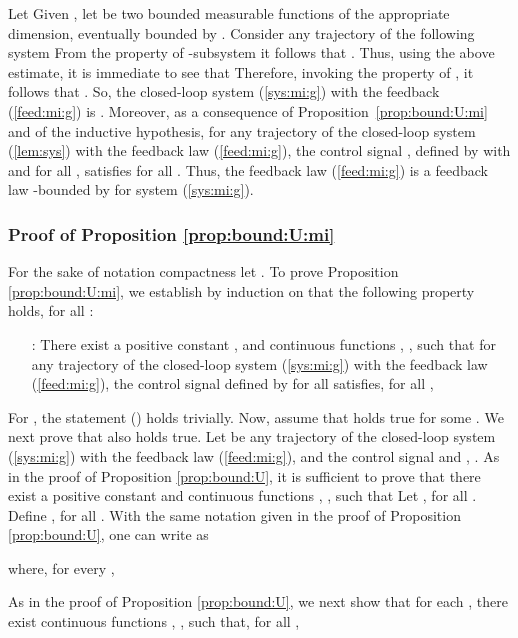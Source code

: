 \documentclass[letterpaper, 10pt]{article}
\newcommand{\rref}[1]{(\ref{#1})}
\begin{document}
Let 
Given , let  be two bounded measurable functions of the appropriate dimension, eventually bounded by . Consider any trajectory  of the following system
 From the  property of -subsystem it follows that . Thus, using the above estimate, it is immediate to see that  Therefore, invoking the  property of
, it follows that . So, the closed-loop system \rref{sys:mi:g} with the feedback \rref{feed:mi:g} is .
Moreover, as a consequence of Proposition~\ref{prop:bound:U:mi} and of the inductive hypothesis, for any trajectory of the closed-loop system \rref{lem:sys} with the feedback law \rref{feed:mi:g}, the control signal , defined by  with  and  for all , satisfies  for all . Thus, the feedback law \rref{feed:mi:g} is a  feedback law -bounded by  for system \rref{sys:mi:g}.

\subsubsection{Proof of Proposition \ref{prop:bound:U:mi}}
\label{sss:Pr:3}
For the sake of notation compactness let . To prove Proposition \ref{prop:bound:U:mi}, we establish by induction on  that the following property holds, for all :
\begin{itemize}
\item[ :]There exist a positive constant , and continuous functions , , such that for any trajectory of the closed-loop system \rref{sys:mi:g} with the feedback law \rref{feed:mi:g}, the control signal  defined by  for all  satisfies, for all ,

\end{itemize}

For , the statement () holds trivially. Now, assume that  holds true for some . We next prove that  also holds true. Let  be any trajectory of the closed-loop system \rref{sys:mi:g} with the feedback law \rref{feed:mi:g}, and the control signal  and , . As in the proof of Proposition \ref{prop:bound:U}, it is sufficient to prove that there exist a positive constant  and continuous functions , , such that
Let , for all . Define , for all . With the same notation given in the proof of Proposition \ref{prop:bound:U}, one can write  as

where, for every ,
 
As in the proof of Proposition \ref{prop:bound:U}, we next show that  for each , there exist continuous functions  , , such that, for all ,
\end{document}

